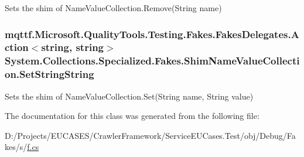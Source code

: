Sets the shim of Name\-Value\-Collection.\-Remove(\-String name)

\hypertarget{class_system_1_1_collections_1_1_specialized_1_1_fakes_1_1_shim_name_value_collection_ad87d9256e4d591f5fd500d1bef845798}{
\subsubsection[{Set\-String\-String}]{\setlength{\rightskip}{0pt plus 5cm}mqttf.\-Microsoft.\-Quality\-Tools.\-Testing.\-Fakes.\-Fakes\-Delegates.\-Action$<$string, string$>$ System.\-Collections.\-Specialized.\-Fakes.\-Shim\-Name\-Value\-Collection.\-Set\-String\-String\hspace{0.3cm}{\ttfamily [set]}}}\label{class_system_1_1_collections_1_1_specialized_1_1_fakes_1_1_shim_name_value_collection_ad87d9256e4d591f5fd500d1bef845798}


Sets the shim of Name\-Value\-Collection.\-Set(\-String name, String value)



The documentation for this class was generated from the following file\-:\begin{DoxyCompactItemize}
\item 
D\-:/\-Projects/\-E\-U\-C\-A\-S\-E\-S/\-Crawler\-Framework/\-Service\-E\-U\-Cases.\-Test/obj/\-Debug/\-Fakes/s/\hyperlink{s_2f_8cs}{f.\-cs}\end{DoxyCompactItemize}

